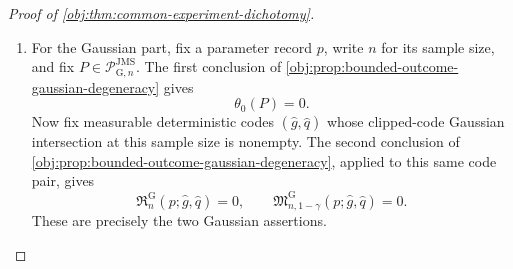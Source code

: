 \begin{proof}[Proof of \cref{obj:thm:common-experiment-dichotomy}]
\begin{enumerate}
For the compiled statement, fix a compiled bounded spectral adapter satisfying the full canonical build-and-compilation specification for
\((p_j,\mathfrak p_{\star,j},\mathfrak c_{\theta,\star,j},\widehat g)\). The represented-data soundness implication for compiled bounded spectral adapters states that this full canonical build-and-compilation specification entails the represented-execution contract for the same parameter record, primitive bank record, range record, and treatment-code sequence. Its proof rewrites the pilot-boundary, winding-quadrature, and evaluation-quadrature entry points to the reference finite programs, identifies the compiled represented program with the ordinary finite-rational program on canonical represented inputs, and then applies the clipping certificate for \(\mathfrak c_{\theta,\star,j}\). Therefore the compiled represented-data execution realizes
\[
(p_j,\mathfrak p_{\star,j},\mathfrak c_{\theta,\star,j},\widehat g)
\]
with the same ordinary finite-rational result, trace, and certified clipped output required by the represented-execution clause of the theorem.

\item
For the Gaussian part, fix a parameter record \(p\), write \(n\) for its sample size, and fix \(P\in\mathcal P_{\mathrm G,n}^{\mathrm{JMS}}\). The first conclusion of \cref{obj:prop:bounded-outcome-gaussian-degeneracy} gives
\[
\theta_0(P)=0.
\]
Now fix measurable deterministic codes \((\widehat g,\widehat q)\) whose clipped-code Gaussian intersection at this sample size is nonempty. The second conclusion of \cref{obj:prop:bounded-outcome-gaussian-degeneracy}, applied to this same code pair, gives
\[
\mathfrak R_{n}^{\mathrm G}(p;\widehat g,\widehat q)=0,
\qquad
\mathfrak M_{n,1-\gamma}^{\mathrm G}(p;\widehat g,\widehat q)=0.
\]
These are precisely the two Gaussian assertions.
\end{enumerate}
\end{proof}

